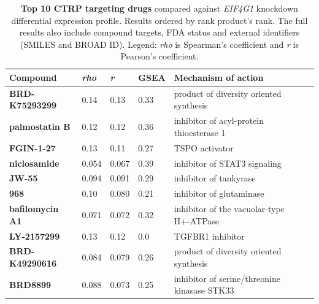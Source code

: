 \begin{table}[!h]
\centering
\footnotesize
\caption[Top 10 CTRP 2.1 targeting drugs]{\textbf{Top 10 CTRP targeting drugs} compared against \emph{EIF4G1} knockdown differential expression profile. Results ordered by rank product's rank. The full results also include compound targets, FDA status and external identifiers (SMILES and BROAD ID). Legend: \emph{rho} is Spearman's coefficient and \emph{r} is Pearson's coefficient.}
\label{tab:eif4g1-ctrp}

\begin{tabular}{llllll}
\toprule
\textbf{Compound}           & \textbf{\emph{rho}} & \textbf{\emph{r}} & \textbf{GSEA} & \textbf{Mechanism of action}                                                         \\
\midrule
\textbf{BRD-K75293299}  & 0.14                    & 0.13                   & 0.33          & product of diversity oriented synthesis                              \\
\textbf{palmostatin B}  & 0.12                    & 0.12                   & 0.36          & inhibitor of acyl-protein thioesterase 1                             \\
\textbf{FGIN-1-27}      & 0.13                    & 0.11                   & 0.27          & TSPO activator \\
\textbf{niclosamide}    & 0.054                   & 0.067                  & 0.39          & inhibitor of STAT3 signaling                                         \\
\textbf{JW-55}          & 0.094                   & 0.091                  & 0.29          & inhibitor of tankyrase                                               \\
\textbf{968}            & 0.10                    & 0.080                  & 0.21          & inhibitor of glutaminase                                             \\
\textbf{bafilomycin A1} & 0.071                   & 0.072                  & 0.32          & inhibitor of the vacuolar-type H+-ATPase                             \\
\textbf{LY-2157299}     & 0.13                    & 0.12                   & 0.0           & TGFBR1 inhibitor      \\
\textbf{BRD-K49290616}  & 0.084                   & 0.079                  & 0.26          & product of diversity oriented synthesis                              \\
\textbf{BRD8899}        & 0.088                   & 0.073                  & 0.25          & inhibitor of serine/threonine kinasase STK33                        \\
\bottomrule
\end{tabular}
\end{table}

